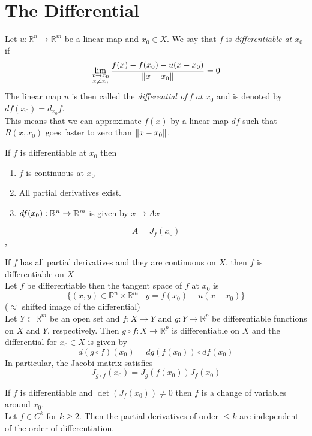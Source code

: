 \section{The Differential}

\Def[Differentiability] Let $u\colon \mathbb{R}^n\to\mathbb{R}^m$ be a linear map and $x_0\in X$. We say that $f$ is \textit{differentiable at $x_0$} if
$$
    \lim_{\substack{x\to x_0\\x\neq x_0}}\frac{f(x)-f(x_0)-u(x-x_0)}{\left\lVert x-x_0 \right\rVert} = 0
$$
The linear map $u$ is then called the \textit{differential of f at $x_0$} and is denoted by $df(x_0) = d_{x_0}f$.\\
\Intuition This means that we can approximate $f(x)$ by a linear map $df$ such that $R(x,x_0)$ goes faster to zero than $\left\lVert x-x_0 \right\rVert$.


\Theorem If $f$ is differentiable at $x_0$ then
\begin{enumerate}
	\item $f$ is continuous at $x_0$
	\item All partial derivatives exist.
	\item $df(x_0): \mathbb{R}^n \rightarrow \mathbb{R}^m$ is given by $x \mapsto Ax$
\end{enumerate}
$$A=J_f(x_0)$$
\sep

 If $f$ has all partial derivatives and they are continuous on $X$, then $f$ is differentiable on $X$ \\

 Let $f$ be differentiable then the tangent space of $f$ at $x_0$ is
$$\{(x,y)\in\mathbb{R}^n\times\mathbb{R}^m\mid y = f(x_0)+u(x-x_0)\} $$
($\approx$ shifted image of the differential) \\

 Let $Y\subset\mathbb{R}^m$ be an open set and $f\colon X \to Y$ and $g\colon Y \to \mathbb{R}^p$ be differentiable functions on $X$ and $Y$, respectively. Then $g\circ f\colon X \to \mathbb{R}^p$ is differentiable on $X$ and the differential for  $x_0\in X$ is given by 
$$
    d(g\circ f)(x_0) = dg(f(x_0))\circ df(x_0)
$$
In particular, the Jacobi matrix satisfies
$$
    J_{g\circ f}(x_0) = J_g(f(x_0)) J_f(x_0)
$$

 If $f$ is differentiable and $\det(J_f(x_0)) \neq 0$ then $f$ is a change of variables around $x_0$. \\

 Let $f \in C^k$ for $k\geq 2$. Then the partial derivatives of order $\leq k$ are independent of the order of differentiation.


